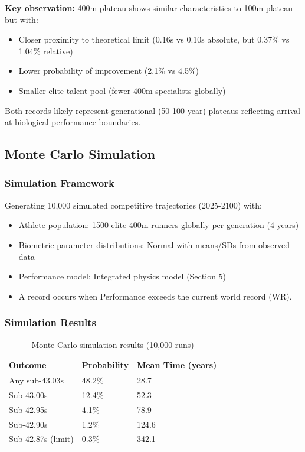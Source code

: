 \textbf{Key observation:} 400m plateau shows similar characteristics to 100m plateau but with:
\begin{itemize}
    \item Closer proximity to theoretical limit (0.16s vs 0.10s absolute, but 0.37\% vs 1.04\% relative)
    \item Lower probability of improvement (2.1\% vs 4.5\%)
    \item Smaller elite talent pool (fewer 400m specialists globally)
\end{itemize}

Both records likely represent generational (50-100 year) plateaus reflecting arrival at biological performance boundaries.

\subsection{Monte Carlo Simulation}

\subsubsection{Simulation Framework}

Generating 10,000 simulated competitive trajectories (2025-2100) with:
\begin{itemize}
    \item Athlete population: 1500 elite 400m runners globally per generation (4 years)
    \item Biometric parameter distributions: Normal with means/SDs from observed data
    \item Performance model: Integrated physics model (Section 5)
    \item A record occurs when Performance exceeds the current world record (WR).
\end{itemize}

\subsubsection{Simulation Results}

\begin{table}[H]
\centering
\caption{Monte Carlo simulation results (10,000 runs)}
\begin{tabular}{@{}lll@{}}
\toprule
\textbf{Outcome} & \textbf{Probability} & \textbf{Mean Time (years)} \\
\midrule
Any sub-43.03s & 48.2\% & 28.7 \\
Sub-43.00s & 12.4\% & 52.3 \\
Sub-42.95s & 4.1\% & 78.9 \\
Sub-42.90s & 1.2\% & 124.6 \\
Sub-42.87s (limit) & 0.3\% & 342.1 \\
\bottomrule
\end{tabular}
\end{table}

